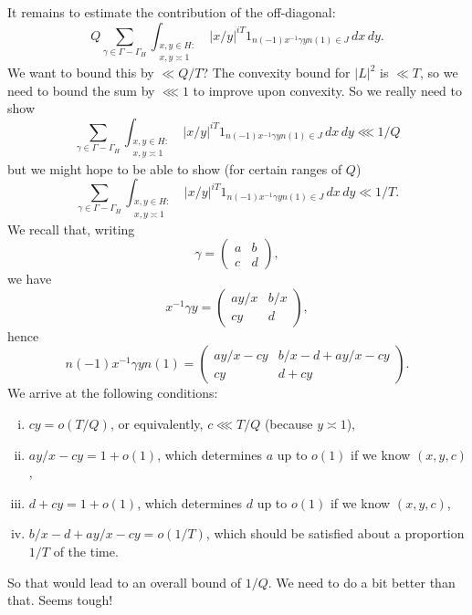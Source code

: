 \documentclass[reqno]{amsart} 
\begin{document}
It remains to estimate the contribution of the off-diagonal:
\begin{equation*}
  Q
  \sum _{\gamma \in \Gamma - \Gamma_H}
  \int _{
    \substack{
      x, y \in H :  \\
       x, y \asymp 1
    }
  }
  \lvert x / y \rvert^{i T}
  1 _{n (- 1 ) x ^{-1} \gamma y n (1) \in J} \, d x \, d y.
\end{equation*}
We want to bound this by $\ll Q/T$?  The convexity bound for $\lvert L \rvert^2$ is $\ll T$, so we need to bound the sum by $\lll 1$ to improve upon convexity.  So we really need to show
\begin{equation*}
  \sum _{\gamma \in \Gamma - \Gamma_H}
  \int _{
    \substack{
      x, y \in H :  \\
       x, y \asymp 1
    }
  }
  \lvert x / y \rvert^{i T}
  1 _{n (- 1 ) x ^{-1} \gamma y n (1) \in J} \, d x \, d y \lll 1/Q
\end{equation*}
but we might hope to be able to show (for certain ranges of $Q$)
\begin{equation*}
  \sum _{\gamma \in \Gamma - \Gamma_H}
  \int _{
    \substack{
      x, y \in H :  \\
       x, y \asymp 1
    }
  }
  \lvert x / y \rvert^{i T}
  1 _{n (- 1 ) x ^{-1} \gamma y n (1) \in J} \, d x \, d y \ll 1/T.
\end{equation*}
We recall that, writing
\begin{equation*}
  \gamma =
  \begin{pmatrix}
    a & b \\
    c & d
  \end{pmatrix},
\end{equation*}
we have
\begin{equation*}
  x ^{-1} \gamma y =
  \begin{pmatrix}
    a y/x & b/x \\
    c y & d
  \end{pmatrix},
\end{equation*}
hence
\begin{equation*}
  n (-1) x ^{-1} \gamma y n (1)
  =
  \begin{pmatrix}
    a y/x - c y & b/x - d + a y / x - c y \\
    c y & d + c y
  \end{pmatrix}.
\end{equation*}
We arrive at the following conditions:
\begin{enumerate}[(i)]
\item\label{enumerate:20230522174144} $c y = o(T/Q)$, or equivalently, $c  \lll T/Q$ (because $y \asymp 1$),
\item\label{enumerate:20230522174157} $ay / x - c y = 1 + o(1)$, which determines $a$ up to $o(1)$ if we know $(x,y,c)$,
\item\label{enumerate:20230522174208} $d + c y = 1 + o(1)$, which determines $d$ up to $o(1)$ if we know $(x,y,c)$,
\item $b /x - d + a y / x - c y = o(1/T)$, which should be satisfied about a proportion $1/T$ of the time.
\end{enumerate}
So that would lead to an overall bound of $1 / Q$.  We need to do a bit better than that.  Seems tough!




{} 
\end{document}
